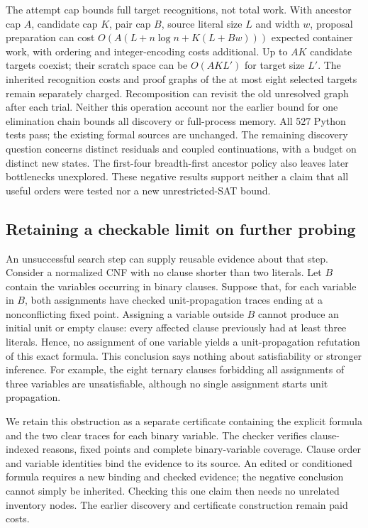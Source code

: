 \documentclass[11pt,a4paper]{article}
\numberwithin{equation}{section}
\theoremstyle{plain}
\theoremstyle{definition}
\theoremstyle{remark}
\begin{document}
The attempt cap bounds full target recognitions, not total work. With ancestor cap $A$, candidate cap $K$, pair cap $B$, source literal size $L$ and width $w$, proposal preparation can cost $O(A(L+n\log n+K(L+Bw)))$ expected container work, with ordering and integer-encoding costs additional. Up to $AK$ candidate targets coexist; their scratch space can be $O(AKL')$ for target size $L'$. The inherited recognition costs and proof graphs of the at most eight selected targets remain separately charged. Recomposition can revisit the old unresolved graph after each trial. Neither this operation account nor the earlier bound for one elimination chain bounds all discovery or full-process memory. All 527 Python tests pass; the existing formal sources are unchanged. The remaining discovery question concerns distinct residuals and coupled continuations, with a budget on distinct new states. The first-four breadth-first ancestor policy also leaves later bottlenecks unexplored. These negative results support neither a claim that all useful orders were tested nor a new unrestricted-SAT bound.

\subsection{Retaining a checkable limit on further probing}
\label{sec:portable-probe-exhaustion}

An unsuccessful search step can supply reusable evidence about that step. Consider a normalized CNF with no clause shorter than two literals. Let $B$ contain the variables occurring in binary clauses. Suppose that, for each variable in $B$, both assignments have checked unit-propagation traces ending at a nonconflicting fixed point. Assigning a variable outside $B$ cannot produce an initial unit or empty clause: every affected clause previously had at least three literals. Hence, no assignment of one variable yields a unit-propagation refutation of this exact formula. This conclusion says nothing about satisfiability or stronger inference. For example, the eight ternary clauses forbidding all assignments of three variables are unsatisfiable, although no single assignment starts unit propagation.

We retain this obstruction as a separate certificate containing the explicit formula and the two clear traces for each binary variable. The checker verifies clause-indexed reasons, fixed points and complete binary-variable coverage. Clause order and variable identities bind the evidence to its source. An edited or conditioned formula requires a new binding and checked evidence; the negative conclusion cannot simply be inherited. Checking this one claim then needs no unrelated inventory nodes. The earlier discovery and certificate construction remain paid costs.
\end{document}
